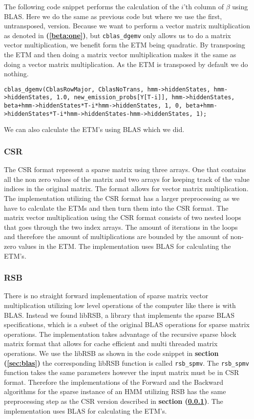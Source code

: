 The following code snippet performs the calculation of the $i$'th column of $\beta$ using BLAS. Here we do the same as previous code but where we use the first, untransposed, version. Because we want to perform a vector matrix multiplication as denoted in \textbf{(\ref{beta:one})}, but \texttt{cblas\_dgemv} only allows us to do a matrix vector multiplication, we benefit form the ETM being quadratic. By transposing the ETM and then doing a matrix vector multiplication makes it the same as doing a vector matrix multiplication. As the ETM is transposed by default we do nothing.
\begin{lstlisting}[style=CStyle]
cblas_dgemv(CblasRowMajor, CblasNoTrans, hmm->hiddenStates, hmm->hiddenStates, 1.0, new_emission_probs[Y[T-i]], hmm->hiddenStates, beta+hmm->hiddenStates*T-i*hmm->hiddenStates, 1, 0, beta+hmm->hiddenStates*T-i*hmm->hiddenStates-hmm->hiddenStates, 1);
\end{lstlisting}

We can also calculate the ETM's using BLAS which we did.

\subsubsection{CSR}\label{sec:csr}

The CSR format represent a sparse matrix using three arrays. One that contains all the non zero values of the matrix and two arrays for keeping track of the value indices in the original matrix. The format allows for vector matrix multiplication. The implementation utilizing the CSR format has a larger preprocessing as we have to calculate the ETMs and then turn them into the CSR format. The matrix vector multiplication using the CSR format consists of two nested loops that goes through the two index arrays. The amount of iterations in the loops and therefore the amount of multiplications are bounded by the amount of non-zero values in the ETM. The implementation uses BLAS for calculating the ETM's.

\subsubsection{RSB}
There is no straight forward implementation of sparse matrix vector multiplication utilizing low level operations of the computer like there is with BLAS. Instead we found libRSB\cite{librsb}, a library that implements the sparse BLAS specifications, which is a subset of the original BLAS operations for sparse matrix operations. The implementation takes advantage of the recursive sparse block matrix format that allows for cache efficient and multi threaded matrix operations. We use the libRSB as shown in the code snippet in \textbf{section (\ref{sec:blas})} the corresponding libRSB function is called \texttt{rsb\_spmv}. The \texttt{rsb\_spmv} function takes the same parameters however the input matrix must be in CSR format. Therefore the implementations of the Forward and the Backward algorithms for the sparse instance of  an HMM utilizing RSB has the same preprocessing step as the CSR version described in \textbf{section (\ref{sec:csr})}. The implementation uses BLAS for calculating the ETM's.

